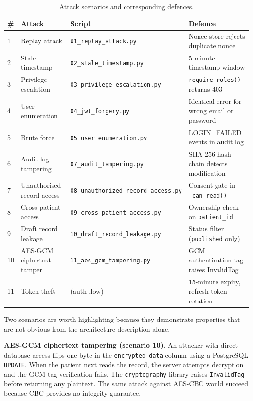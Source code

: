 \documentclass[11pt,a4paper]{article}
\begin{document}
\begin{table}[H]
\centering
\small
\setlength{\tabcolsep}{4pt}
\begin{tabular}{p{0.4cm}p{3.8cm}p{4cm}p{4cm}}
\toprule
\textbf{\#} & \textbf{Attack} & \textbf{Script} & \textbf{Defence} \\
\midrule
1  & Replay attack              & \texttt{01\_replay\_attack.py}              & Nonce store rejects duplicate nonce \\
2  & Stale timestamp            & \texttt{02\_stale\_timestamp.py}            & 5-minute timestamp window \\
3  & Privilege escalation       & \texttt{03\_privilege\_escalation.py}       & \texttt{require\_roles()} returns 403 \\
4  & User enumeration           & \texttt{04\_jwt\_forgery.py}                & Identical error for wrong email or password \\
5  & Brute force                & \texttt{05\_user\_enumeration.py}           & LOGIN\_FAILED events in audit log \\
6  & Audit log tampering        & \texttt{07\_audit\_tampering.py}            & SHA-256 hash chain detects modification \\
7  & Unauthorised record access & \texttt{08\_unauthorized\_record\_access.py}& Consent gate in \texttt{\_can\_read()} \\
8  & Cross-patient access       & \texttt{09\_cross\_patient\_access.py}      & Ownership check on \texttt{patient\_id} \\
9  & Draft record leakage       & \texttt{10\_draft\_record\_leakage.py}      & Status filter (\texttt{published} only) \\
10 & AES-GCM ciphertext tamper  & \texttt{11\_aes\_gcm\_tampering.py}         & GCM authentication tag raises InvalidTag \\
11 & Token theft                & (auth flow)                                 & 15-minute expiry, refresh token rotation \\
\bottomrule
\end{tabular}
\caption{Attack scenarios and corresponding defences.}
\label{tab:attacks}
\end{table}

Two scenarios are worth highlighting because they demonstrate properties
that are not obvious from the architecture description alone.

\textbf{AES-GCM ciphertext tampering (scenario 10).} An attacker with
direct database access flips one byte in the \texttt{encrypted\_data}
column using a PostgreSQL \texttt{UPDATE}. When the patient next reads the
record, the server attempts decryption and the GCM tag verification fails.
The \texttt{cryptography} library raises \texttt{InvalidTag} before
returning any plaintext. The same attack against AES-CBC would succeed
because CBC provides no integrity guarantee.
\end{document}
